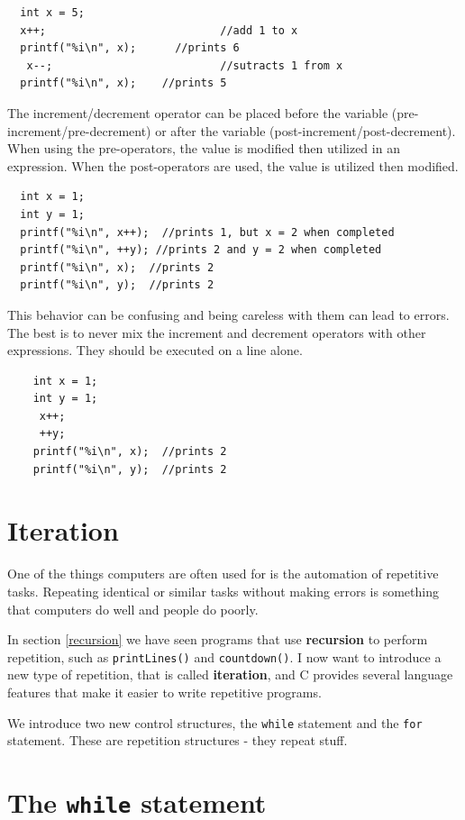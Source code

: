  \begin{verbatim}
  int x = 5;
  x++;         					 //add 1 to x
  printf("%i\n", x);	  //prints 6
   x--;         				 //sutracts 1 from x
  printf("%i\n", x);  	//prints 5
\end{verbatim}
%
 The increment/decrement operator can be placed before the variable (pre-increment/pre-decrement) or after the variable (post-increment/post-decrement). When using the pre-operators, the value is modified then utilized in an expression. When the post-operators are used, the value is utilized then modified. 
  \begin{verbatim}
  int x = 1;
  int y = 1;
  printf("%i\n", x++);  //prints 1, but x = 2 when completed
  printf("%i\n", ++y); //prints 2 and y = 2 when completed
  printf("%i\n", x);  //prints 2
  printf("%i\n", y);  //prints 2
 \end{verbatim}
This behavior can be confusing and being careless with them can lead to errors. 
The best is to never mix the increment and decrement operators with other expressions. 
They should be executed on a line alone.
  \begin{verbatim}
	int x = 1;
	int y = 1;
	 x++;
	 ++y;
	printf("%i\n", x);  //prints 2
	printf("%i\n", y);  //prints 2
\end{verbatim}
%
\section{Iteration}

One of the things computers are often used for is the automation
of repetitive tasks.  Repeating identical or similar tasks without
making errors is something that computers do well and people do
poorly.

In section \ref{recursion} we have seen programs that use {\bf recursion} to perform
repetition, such as {\tt printLines()} and {\tt countdown()}. 
I now want to introduce a new
type of repetition, that is called {\bf iteration}, and C provides
several language features that make it easier to write repetitive
programs.

We introduce two new control structures,  the {\tt while}
statement and the {\tt for} statement. 
These are repetition structures - they repeat stuff.

\section{The {\tt while} statement}

